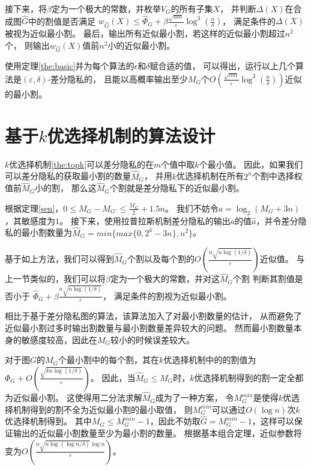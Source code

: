 接下来，将$\beta$定为一个极大的常数，并枚举$V_G$的所有子集$X$，
并判断$\Delta(X)$在合成图$\hat G$中的割值是否满足
$w_{\hat G}(X)\leq \hat \Phi_G+\beta \frac{\sqrt{nm}}{\varepsilon} \log^3 \left(\frac{n}{\delta}\right)$，
满足条件的$\Delta(X)$被视为近似最小割。
最后，输出所有近似最小割，若这样的近似最小割超过$n^2$个，
则输出$w_{\hat G}(X)$值前$n^2$小的近似最小割。

使用定理\ref{the:basic}并为每个算法的$\epsilon$和$\delta$赋合适的值，
可以得出，运行以上几个算法是$(\varepsilon,\delta)$-差分隐私的，
且能以高概率输出至少$M_G$个$O\left(\frac{\sqrt{nm}}{\varepsilon} \log^3 \left(\frac{n}{\delta}\right)\right)$近似的最小割。

\section{基于$k$优选择机制的算法设计}

$k$优选择机制\ref{the:topk}可以差分隐私的在$m$个值中取$k$个最小值。
因此，如果我们可以差分隐私的获取最小割的数量$\hat M_G$，
并用$k$优选择机制在所有$2^n$个割中选择权值前$\hat M_G$小的割，
那么这$\hat M_G$个割就是差分隐私下的近似最小割。

根据定理\ref{sen}，$0\leq M_G-M_{G'}\leq \frac{M_G}2+1.5n$。
我们不妨令$a=\log_2(M_G+3n)$，其敏感度为$1$。
接下来，使用拉普拉斯机制差分隐私的输出$a$的值$\hat a$，并令差分隐私的最小割数量为$\hat M_G=min{\{max{\{0,2^{\hat a}-3n\}},n^2\}}$。

基于如上方法，我们可以得到$\hat M_G$个割以及每个割的$O(\frac{n\sqrt{n\log(1/\delta)}}{\varepsilon})$近似值。
与上一节类似的，我们可以将$\beta$定为一个极大的常数，并对这$\hat M_G$个割
判断其割值是否小于
$\hat \Phi_G+\beta \frac{n\sqrt{n\log(1/\delta)}}{\varepsilon}$，
满足条件的割视为近似最小割。

相比于基于差分隐私图的算法，该算法加入了对最小割数量的估计，
从而避免了近似最小割过多时输出割数量与最小割数量差异较大的问题。
然而最小割数量本身的敏感度较高，因此在$M_G$较小的时候误差较大。

对于图$G$的$M_G$个最小割中的每个割，其在$k$优选择机制中的的割值为$\Phi_G+O(\frac{\sqrt{kn\log(1/\delta)}}{\varepsilon})$。
因此，当$\hat M_G\leq M_G$时，$k$优选择机制得到的割一定全都为近似最小割。
这使得用二分法求解$\hat M_G$成为了一种方案，
令$M^{min}_G$是使得$k$优选择机制得到的割不全为近似最小割的最小取值，
则$M^{min}_G$可以通过$O(\log n)$次$k$优选择机制得到。
其中$M_G\leq M^{min}_G-1$，因此不妨取$\hat G=M^{min}_G-1$，这样可以保证输出的近似最小割数量至少为最小割的数量。
根据基本组合定理，近似参数将变为$O(\frac{n\sqrt{n\log(\log n/\delta)}\log n}{\varepsilon})$。

